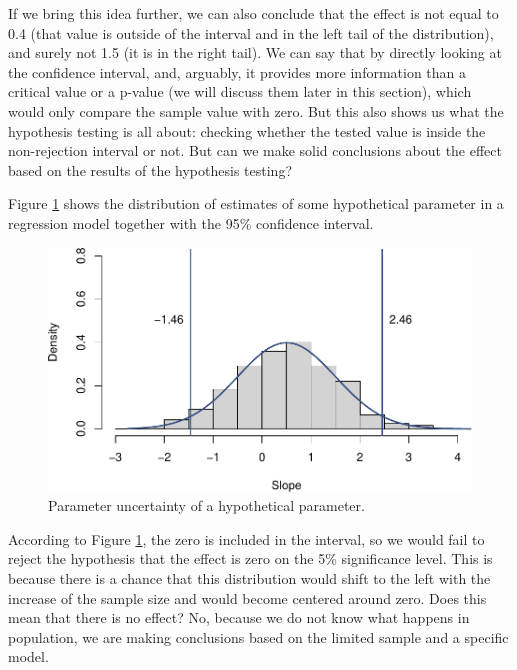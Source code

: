 \documentclass[
]{book}
\theoremstyle{definition}
\theoremstyle{definition}
\theoremstyle{definition}
\theoremstyle{definition}
\theoremstyle{remark}
\begin{document}
If we bring this idea further, we can also conclude that the effect is not equal to 0.4 (that value is outside of the interval and in the left tail of the distribution), and surely not 1.5 (it is in the right tail). We can say that by directly looking at the confidence interval, and, arguably, it provides more information than a critical value or a p-value (we will discuss them later in this section), which would only compare the sample value with zero. But this also shows us what the hypothesis testing is all about: checking whether the tested value is inside the non-rejection interval or not. But can we make solid conclusions about the effect based on the results of the hypothesis testing?

Figure \ref{fig:costsModelMLRCIWithZero} shows the distribution of estimates of some hypothetical parameter in a regression model together with the 95\% confidence interval.

\begin{figure}
\centering
\includegraphics{Svetunkov---Statistics-for-Business-Analytics_files/figure-latex/costsModelMLRCIWithZero-1.pdf}
\caption{\label{fig:costsModelMLRCIWithZero}Parameter uncertainty of a hypothetical parameter.}
\end{figure}

According to Figure \ref{fig:costsModelMLRCIWithZero}, the zero is included in the interval, so we would fail to reject the hypothesis that the effect is zero on the 5\% significance level. This is because there is a chance that this distribution would shift to the left with the increase of the sample size and would become centered around zero. Does this mean that there is no effect? No, because we do not know what happens in population, we are making conclusions based on the limited sample and a specific model.
\end{document}
